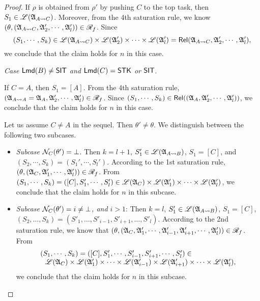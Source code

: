 \begin{proof}
If $\rho$ is obtained from $\rho'$ by pushing $C$ to the top task, then $S_1 \in {\mathscr{L} }({\mathfrak{A} }_{A \rightsquigarrow C})$. Moreover, from the 4th saturation rule, we know $(\theta, ({\mathfrak{A} }_{A \rightsquigarrow C}, {\mathfrak{A} }'_2, \cdots, {\mathfrak{A} }'_l)) \in \mathscr{R}_f$. 
Since 
$$(S_1, \cdots, S_k) \in {\mathscr{L} }({\mathfrak{A} }_{A \rightsquigarrow C}) \times {\mathscr{L} }({\mathfrak{A} }'_2) \times \cdots \times {\mathscr{L} }({\mathfrak{A} }'_l) = \mathsf{Rel}({\mathfrak{A} }_{A \rightsquigarrow C}, {\mathfrak{A} }'_2, \cdots, {\mathfrak{A} }'_l),$$ 
we conclude that the claim holds for $n$ in this case. 

\smallskip

\noindent \emph{Case ${\sf Lmd}(B) \neq {\sf SIT}$ and ${\sf Lmd}(C) = {\sf STK}$ or ${\sf SIT}$}. 

If $C = A$, then $S_1 = [A]$. From the 4th saturation rule, $({\mathfrak{A} }_{A \rightsquigarrow A} = {\mathfrak{A} }_A, {\mathfrak{A} }'_2, \cdots, {\mathfrak{A} }'_l) \in \mathscr{R}_f$. Since $(S_1, \cdots, S_k) \in \mathsf{Rel}(({\mathfrak{A} }_A, {\mathfrak{A} }'_2, \cdots, {\mathfrak{A} }'_l))$, we conclude that the claim holds for $n$ in this case. 

Let us assume $C \neq A$ in the sequel.  Then $\theta' \neq \theta$.  We distinguish between the following two subcases. 
\begin{itemize}
    \item \emph{Subcase $\mathcal{N}_{C}(\theta') = \bot$}. Then $k=l+1$, $S_1' \in {\mathscr{L} }({\mathfrak{A} }_{A\rightsquigarrow B})$, $S_1=[C]$, and $(S_2,\cdots,S_k)=(S_1',\cdots,S_l')$.  According to the 1st saturation rule, $(\theta, ({\mathfrak{A} }_{C}, {\mathfrak{A} }_1', \cdots, {\mathfrak{A} }_l')) \in \mathscr{R}_f$.
   From $(S_1, \cdots, S_k) = ([C], S_1', \cdots, S_l') \in {\mathscr{L} }({\mathfrak{A} }_{C}) \times {\mathscr{L} }({\mathfrak{A} }_1') \times \cdots \times {\mathscr{L} }({\mathfrak{A} }_l')$, we conclude that the claim holds for $n$ in this subcase.
    \item \emph{Subcase $\mathcal{N}_{C}(\theta') = i \neq \bot$, and $i > 1$}: Then $k = l$, 
    $S'_1  \in {\mathscr{L} }({\mathfrak{A} }_{A\rightsquigarrow B})$, $S_1 = [C]$, $(S_2, \dots, S_k) = (S'_1, \dots, S'_{i-1}, S'_{i+1}, \dots, S'_l)$. According to the 2nd saturation rule, we know that $(\theta, ({\mathfrak{A} }_{C}, {\mathfrak{A} }_1',\cdots, {\mathfrak{A} }_{i-1}', {\mathfrak{A} }_{i+1}', \cdots, {\mathfrak{A} }_{l}')) \in \mathscr{R}_f$. 
    From 
    $$
    \begin{array}{l}
    	(S_1,\cdots,S_k) = ([C], S_1', \cdots, S_{i-1}', S_{i+1}', \cdots, S_l') \in \\
    	\ \ {\mathscr{L} }({\mathfrak{A} }_{C}) \times {\mathscr{L} }({\mathfrak{A} }_1') \times \cdots \times {\mathscr{L} }({\mathfrak{A} }_{i-1}') \times {\mathscr{L} }({\mathfrak{A} }_{i+1}')\times \cdots \times {\mathscr{L} }({\mathfrak{A} }_{l}'),
    \end{array}
    $$  
    we conclude that the claim holds for $n$ in this subcase. 
%
\end{itemize}


\end{proof}
